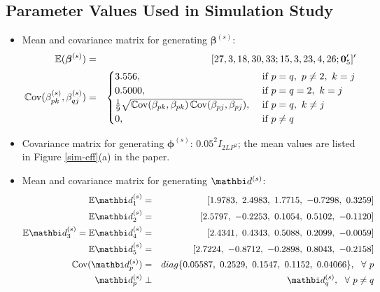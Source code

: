 \documentclass[12pt,titlepage,fleqn]{article}
\newcommand{\Cov}{\mathop{\rm {\mathbb C}ov}\nolimits}%
\newcommand{\E}{{\mathbb E}}
\newcommand{\1}{{\bm 1}}
\newcommand{\vd}{\mathbi d}
\newcommand{\vzero}{\mathbf{0}}
\newcommand{\vbeta}{\boldsymbol \beta}
\newcommand{\vphi}{\boldsymbol \phi}
\newcommand{\s}{^{(s)}}
\begin{document}
\subsection*{Parameter Values Used in Simulation Study} 
\begin{itemize}
\item Mean and covariance matrix for generating $\vbeta\s$:
\vspace{-.1in}
\begin{eqnarray*}
\E(\vbeta\s) &=& [27,  3,  18, 30, 33; 15,  3, 23, 4, 26; \vzero_5']'\\
\Cov(\beta_{pk}\s, \beta_{qj}\s) &=&
\begin{cases}
3.556, &\text{ if } p=q, ~p\ne 2, ~k=j\\
0.5000, &\text{ if } p=q=2, ~k=j\\
\frac{1}{9}\sqrt{\Cov(\beta_{pk}, \beta_{pk})\Cov(\beta_{pj}, \beta_{pj}}), &\text{ if } p=q, ~k\ne j\\
0, &\text{ if } p\ne q
\end{cases}
\end{eqnarray*}

\item Covariance matrix for generating $\vphi\s$: $0.05^2I_{2LP^2}$; the mean values are listed in Figure \ref{sim-eff}(a) in the paper.  
\item Mean and covariance matrix for generating $\vd\s$:
\begin{eqnarray*}
\E\vd_1\s &=& [1.9783, ~ 2.4983, ~ 1.7715,~ -0.7298, ~ 0.3259]\\
\E\vd_2\s &=& [2.5797, ~-0.2253,~  0.1054, ~ 0.5102,~ -0.1120]\\
\E\vd_3\s = \E\vd_4\s &=& [2.4341, ~ 0.4343, ~ 0.5088, ~ 0.2099,~ -0.0059]\\
\E\vd_5\s &=& [2.7224,~ -0.8712,~ -0.2898, ~ 0.8043,~ -0.2158]\\ 
\Cov(\vd_{p}\s) &=& diag\{0.05587,~ 0.2529, ~0.1547, ~0.1152, ~0.04066\}, ~~\forall ~p\\
\vd_{p}\s &\perp& \vd_{q}\s, ~~ \forall ~p\ne q
\end{eqnarray*}



\end{itemize}
\end{document}
